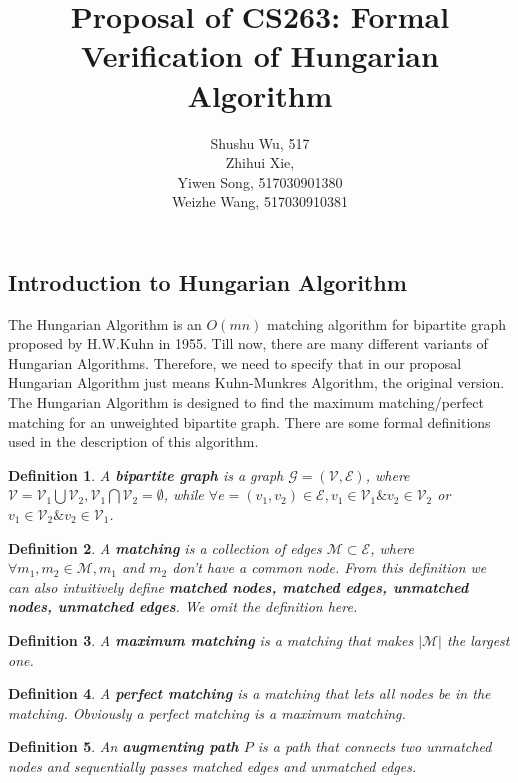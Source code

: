 \documentclass{paper}
\title{Proposal of CS263: Formal Verification of Hungarian Algorithm}
\author{Shushu Wu, 517\\ Zhihui Xie,  \\Yiwen Song, 517030901380\\Weizhe Wang, 517030910381}
\newtheorem{definition}{Definition}
\begin{document}
\maketitle
\begin{spacing}{1.2}
\section{Introduction to Hungarian Algorithm}
    The Hungarian Algorithm \cite{Hungarian} is an $O(mn)$ matching algorithm for bipartite graph proposed by H.W.Kuhn in 1955. Till now, there are many different variants of Hungarian Algorithms. Therefore, we need to specify that in our proposal Hungarian Algorithm just means Kuhn-Munkres Algorithm, the original version. \\
    The Hungarian Algorithm is designed to find the maximum matching/perfect matching for an unweighted bipartite graph. There are some formal definitions used in the description of this algorithm.
    \begin{definition}\label{bipartiteGraph}
        A \textbf{bipartite graph} is a graph $\mathcal{G}=(\mathcal{V}, \mathcal{E})$, where $\mathcal{V}=\mathcal{V}_1\bigcup\mathcal{V}_2, \mathcal{V}_1\bigcap\mathcal{V}_2=\emptyset$, while $\forall e=(v_1, v_2)\in\mathcal{E}, v_1\in\mathcal{V}_1\& v_2\in\mathcal{V}_2$ or $v_1\in\mathcal{V}_2\&v_2\in\mathcal{V}_1$.
    \end{definition}
    \begin{definition}\label{matching}
        A \textbf{matching} is a collection of edges $\mathcal{M}\subset\mathcal{E}$, where $\forall m_1, m_2\in\mathcal{M}, m_1$ and $m_2$ don't have a common node. From this definition we can also intuitively define \textbf{matched nodes, matched edges, unmatched nodes, unmatched edges}. We omit the definition here.
    \end{definition}
    \begin{definition}\label{maximumMatching}
        A \textbf{maximum matching} is a matching that makes $|\mathcal{M}|$ the largest one.
    \end{definition}
    \begin{definition}\label{perfectMatching}
        A \textbf{perfect matching} is a matching that lets all nodes be in the matching. Obviously a perfect matching is a maximum matching.
    \end{definition}
    \begin{definition}\label{augmentingPath}
        An \textbf{augmenting path} $P$ is a path that connects two unmatched nodes and sequentially passes matched edges and unmatched edges.

\end{definition}
\end{spacing}
\end{document}
